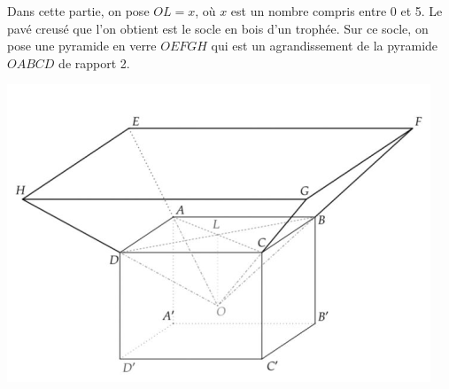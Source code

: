 \begin{minipage}{12cm}
Dans cette partie, on pose $OL = x$, où $x$ est un nombre compris entre 0 et 5. Le pavé creusé que l’on
obtient est le socle en bois d'un trophée. Sur ce socle, on pose une pyramide en verre $OEFGH$ qui est
un agrandissement de la pyramide $OABCD$ de rapport 2.
\end{minipage}
\begin{minipage}{7cm}
\begin{center}
	\includegraphics[width=.9\textwidth]{./images/2022-g2-ex3-img2.png}
\end{center}
\end{minipage}

